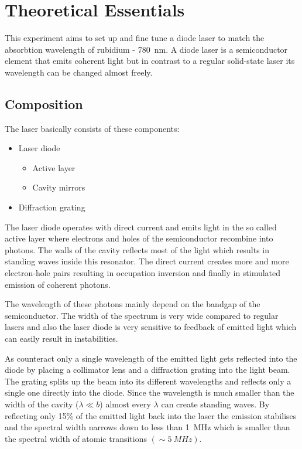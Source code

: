 
\section{Theoretical Essentials}
This experiment aims to set up and fine tune a diode laser to match the absorbtion wavelength of rubidium - \SI{780}{nm}. A diode laser is a semiconductor element that emits coherent light but in contrast to a regular solid-state laser its wavelength can be changed almost freely.
\subsection{Composition}
The laser basically consists of these components:
\begin{itemize}
	\item Laser diode
	\begin{itemize}
		\item Active layer
		\item Cavity mirrors
	\end{itemize}
	\item Diffraction grating
\end{itemize}

The laser diode operates with direct current and emits light in the so called active layer where electrons and holes of the semiconductor recombine into photons. The walls of the cavity reflects most of the light which results in standing waves inside this resonator. The direct current creates more and more electron-hole pairs resulting in occupation inversion and finally in stimulated emission of coherent photons.

The wavelength of these photons mainly depend on the bandgap of the semiconductor. The width of the spectrum is very wide compared to regular lasers and also the laser diode is very sensitive to feedback of emitted light which can easily result in instabilities. 

As counteract only a single wavelength of the emitted light gets reflected into the diode by placing a collimator lens and a diffraction grating into the light beam. The grating splits up the beam into its different wavelengths and reflects only a single one directly into the diode. Since the wavelength is much smaller than the width of the cavity ($\lambda \ll b$) almost every $\lambda$ can create standing waves. By reflecting only 15\% of the emitted light back into the laser the emission stabilises and the spectral width narrows down to less than \SI{1}{MHz} which is smaller than the spectral width of atomic transitions $(\sim \SI{5}{MHz})$.

